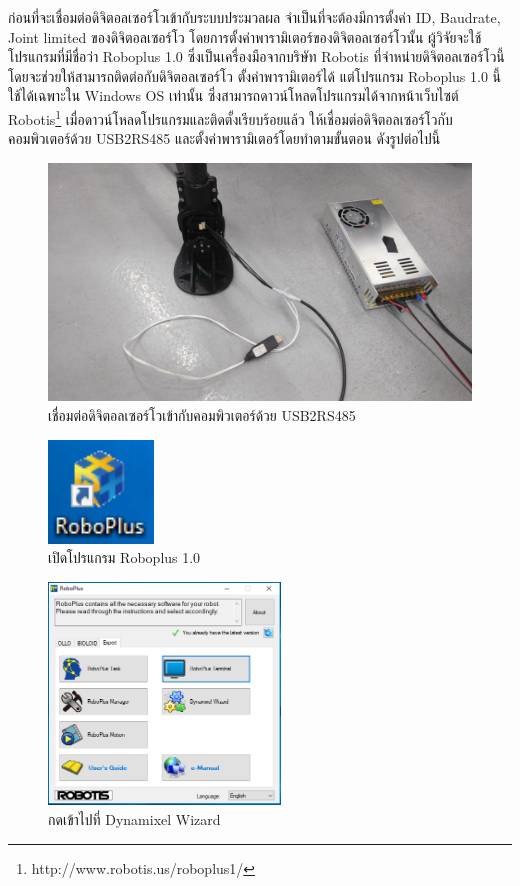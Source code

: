 ก่อนที่จะเชื่อมต่อดิจิตอลเซอร์โวเข้ากับระบบประมวลผล จำเป็นที่จะต้องมีการตั้งค่า ID, Baudrate, Joint limited 
ของดิจิตอลเซอร์โว โดยการตั้งค่าพารามิเตอร์ของดิจิตอลเซอร์โวนั้น ผู้วิจัยจะใช้โปรแกรมที่มีชื่อว่า
Roboplus 1.0 ซึ่งเป็นเครื่องมือจากบริษัท Robotis ที่จำหน่ายดิจิตอลเซอร์โวนี้ โดยจะช่วยให้สามารถติดต่อกับดิจิตอลเซอร์โว
ตั้งค่าพารามิเตอร์ได้ แต่โปรแกรม Roboplus 1.0 นี้ใช้ได้เฉพาะใน Windows OS เท่านั้น ซึ่งสามารถดาวน์โหลดโปรแกรมได้จากหน้าเว็บไซต์ Robotis\footnote{http://www.robotis.us/roboplus1/}
เมื่อดาวน์โหลดโปรแกรมและติดตั้งเรียบร้อยแล้ว ให้เชื่อมต่อดิจิตอลเซอร์โวกับคอมพิวเตอร์ด้วย USB2RS485
และตั้งค่าพารามิเตอร์โดยทำตามขั้นตอน ดังรูปต่อไปนี้
\begin{figure}[!ht]
    \centering
    \includegraphics[width=\textwidth]{chapter3/images/roboplus/roboplus0.jpg}
    \caption*{เชื่อมต่อดิจิตอลเซอร์โวเข้ากับคอมพิวเตอร์ด้วย USB2RS485}
\end{figure}
\begin{figure}[!ht]
    \centering
    \includegraphics[width=0.25\textwidth]{chapter3/images/roboplus/roboplus1.PNG}
    \caption*{เปิดโปรแกรม Roboplus 1.0}
\end{figure}
\begin{figure}[!ht]
    \centering
    \includegraphics[width=0.55\textwidth]{chapter3/images/roboplus/roboplus2.PNG}
    \caption*{กดเข้าไปที่ Dynamixel Wizard}
\end{figure}

